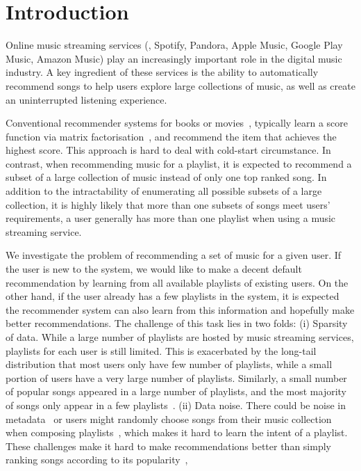 \section{Introduction}
\label{sec:intro}
Online music streaming services (\eg, Spotify, Pandora, Apple Music, Google Play Music, Amazon Music) 
play an increasingly important role in the digital music industry.
A key ingredient of these services is the ability to automatically recommend songs to help users explore large collections of music,
as well as create an uninterrupted listening experience.

Conventional recommender systems for books or movies~\citep{Sarwar:2001,Netflix},
typically learn a score function via matrix factorisation~\citep{Koren:2009},
and recommend the item that achieves the highest score.
This approach is hard to deal with cold-start circumstance.
%
In contrast, when recommending music for a playlist, 
it is expected to recommend a subset of a large collection of music instead of only one top ranked song.
In addition to the intractability of enumerating all possible subsets of a large collection,
it is highly likely that more than one subsets of songs meet users' requirements,
\eg a user generally has more than one playlist when using a music streaming service.

We investigate the problem of recommending a set of music for a given user.
If the user is new to the system, we would like to make a decent default recommendation by learning from 
all available playlists of existing users.
On the other hand, if the user already has a few playlists in the system, it is expected the recommender 
system can also learn from this information and hopefully make better recommendations.
%
The challenge of this task lies in two folds:
(i) Sparsity of data. While a large number of playlists are hosted by music streaming services,
playlists for each user is still limited. This is exacerbated by the long-tail distribution that
most users only have few number of playlists, while a small portion of users have a very large number of playlists.
Similarly, a small number of popular songs appeared in a large number of playlists, and the most majority of songs
only appear in a few playlists~\cite{bonnin2013evaluating}.
(ii) Data noise. There could be noise in metadata~\cite{bonnin2015automated} or users might randomly choose songs 
from their music collection when composing playlists~\cite{mcfee2012hypergraph},
which makes it hard to learn the intent of a playlist.
These challenges make it hard to make recommendations better than simply ranking songs according to its 
popularity~\cite{mcfee2012million,bonnin2013evaluating,bonnin2015automated},


